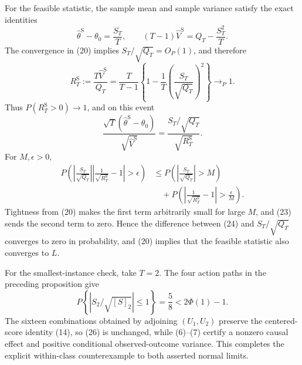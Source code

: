 For the feasible statistic, the sample mean and sample variance satisfy the exact identities
\[
\widehat\theta^{\mathrm S}-\theta_0=\frac{S_T}{T},
\qquad
(T-1)\widehat V^{\mathrm S}=Q_T-\frac{S_T^2}{T}.
\tag{22}
\]
The convergence in (20) implies \(S_T/\sqrt{Q_T}=O_P(1)\), and therefore
\[
R_T^{\mathrm S}:=\frac{T\widehat V^{\mathrm S}}{Q_T}
=\frac{T}{T-1}
\left\{1-\frac1T\left(\frac{S_T}{\sqrt{Q_T}}\right)^2\right\}
\to_P1.
\tag{23}
\]
Thus \(P(R_T^{\mathrm S}>0)\to1\), and on this event
\[
\frac{\sqrt T(\widehat\theta^{\mathrm S}-\theta_0)}{\sqrt{\widehat V^{\mathrm S}}}
=\frac{S_T/\sqrt{Q_T}}{\sqrt{R_T^{\mathrm S}}}.
\tag{24}
\]
For \(M,\epsilon>0\),
\[
\begin{aligned}
P\!\left(
\left|\frac{S_T}{\sqrt{Q_T}}\right|
\left|\frac1{\sqrt{R_T^{\mathrm S}}}-1\right|>\epsilon
\right)
&\le P\!\left(\left|\frac{S_T}{\sqrt{Q_T}}\right|>M\right)\\
&\quad+P\!\left(\left|\frac1{\sqrt{R_T^{\mathrm S}}}-1\right|>\frac\epsilon M\right).
\end{aligned}
\tag{25}
\]
Tightness from (20) makes the first term arbitrarily small for large \(M\), and (23) sends the second term to zero.  Hence the difference between (24) and \(S_T/\sqrt{Q_T}\) converges to zero in probability, and (20) implies that the feasible statistic also converges to \(L\).

For the smallest-instance check, take \(T=2\).  The four action paths in the preceding proposition give
\[
P\!\left\{\left|S_2/\sqrt{[S]_2}\right|\le1\right\}=\frac58<2\Phi(1)-1.
\tag{26}
\]
The sixteen combinations obtained by adjoining \((U_1,U_2)\) preserve the centered-score identity (14), so (26) is unchanged, while (6)--(7) certify a nonzero causal effect and positive conditional observed-outcome variance.  This completes the explicit within-class counterexample to both asserted normal limits.